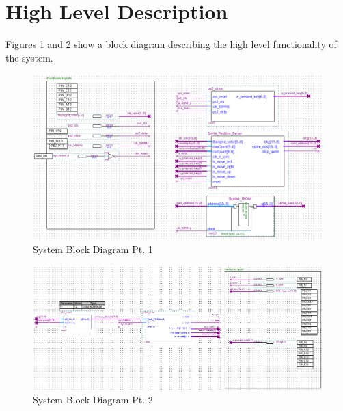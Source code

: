 \documentclass[a4paper]{article}
\begin{document}
\section{High Level Description}
Figures \ref{fig:sys_bd1} and \ref{fig:sys_bd2} show a block diagram describing the high level functionality of the system.
\vspace{.25 in}
\begin{figure}[!h]
  \centering
    \includegraphics[width=5.91in]{Images/sys_bd_1.png}
	\caption{System Block Diagram Pt. 1}
    \label{fig:sys_bd1}
\end{figure}
\vspace{.25 in}
\begin{figure}[!h]
  \centering
    \includegraphics[width=5.91in]{Images/sys_bd_2.png}
	\caption{System Block Diagram Pt. 2}
    \label{fig:sys_bd2}
\end{figure}
\end{document}
